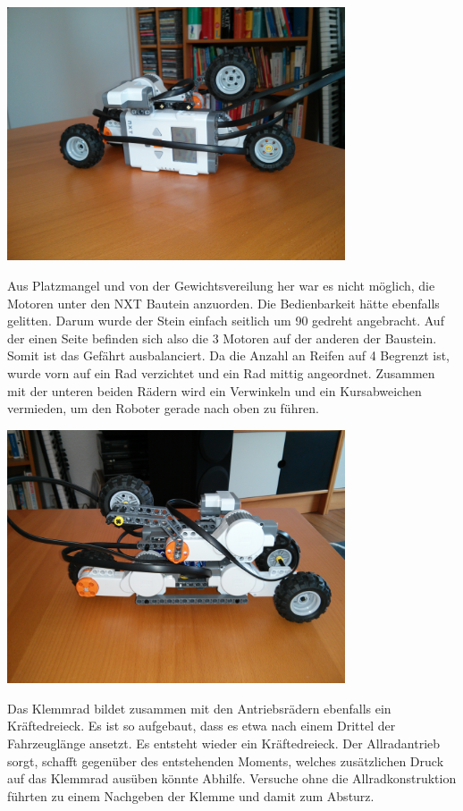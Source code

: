 \begin{capfigure}
	\includegraphics[width=10cm]{images/kletter1.jpg}
\end{capfigure}
      
Aus Platzmangel und von der Gewichtsvereilung her war es nicht möglich, die Motoren unter den NXT Bautein anzuorden. Die Bedienbarkeit hätte ebenfalls gelitten. Darum wurde der Stein einfach seitlich um 90 gedreht angebracht. Auf der einen Seite befinden sich also die 3 Motoren auf der anderen der Baustein. Somit ist das Gefährt ausbalanciert. Da die Anzahl an Reifen auf 4 Begrenzt ist, wurde vorn auf ein Rad verzichtet und ein Rad mittig angeordnet. Zusammen mit der unteren beiden Rädern wird ein Verwinkeln und ein Kursabweichen vermieden, um den Roboter gerade nach oben zu führen. 
            
\begin{capfigure}
	\includegraphics[width=10cm]{images/kletter2.jpg}
\end{capfigure}
      
Das Klemmrad bildet zusammen mit den Antriebsrädern ebenfalls ein Kräftedreieck. Es ist so aufgebaut, dass es etwa nach einem Drittel der Fahrzeuglänge ansetzt. Es entsteht wieder ein Kräftedreieck. Der Allradantrieb sorgt, schafft gegenüber des entstehenden Moments, welches zusätzlichen Druck auf das Klemmrad ausüben könnte Abhilfe. Versuche ohne die Allradkonstruktion führten zu einem Nachgeben der Klemme und damit zum Absturz.
      
